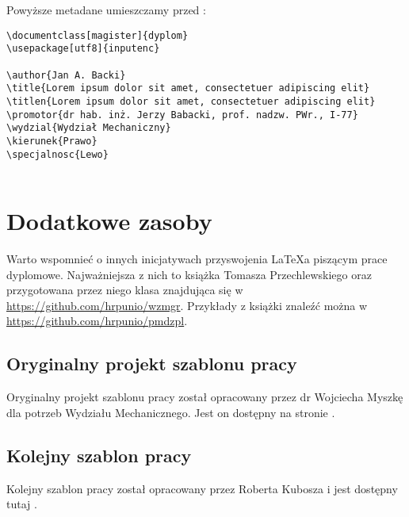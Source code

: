 \begin{enumerate}
\begin{itemize}
\end{itemize}
Powyższe metadane umieszczamy przed \verb||:
\begin{verbatim}
\documentclass[magister]{dyplom}
\usepackage[utf8]{inputenc}

\author{Jan A. Backi}
\title{Lorem ipsum dolor sit amet, consectetuer adipiscing elit}
\titlen{Lorem ipsum dolor sit amet, consectetuer adipiscing elit}
\promotor{dr hab. inż. Jerzy Babacki, prof. nadzw. PWr., I-77}
\wydzial{Wydział Mechaniczny}
\kierunek{Prawo}
\specjalnosc{Lewo}


\end{verbatim} 

\end{enumerate}

\section{Dodatkowe zasoby}

Warto wspomnieć  o innych inicjatywach przyswojenia LaTeX{}a piszącym prace dyplomowe. Najważniejsza z nich to książka Tomasza Przechlewskiego \cite{tp-11-latex} oraz przygotowana przez niego klasa znajdująca się w \url{https://github.com/hrpunio/wzmgr}. Przykłady z książki znaleźć można w \url{https://github.com/hrpunio/pmdzpl}.


\subsection{Oryginalny projekt szablonu pracy}

Oryginalny projekt szablonu pracy został opracowany przez dr Wojciecha Myszkę dla potrzeb Wydziału Mechanicznego. Jest on dostępny na stronie \cite{myszka_latex_praca}.

\subsection{Kolejny szablon pracy}

Kolejny szablon pracy został opracowany przez Roberta Kubosza i jest dostępny tutaj \cite{kubosz_latex_praca}.
